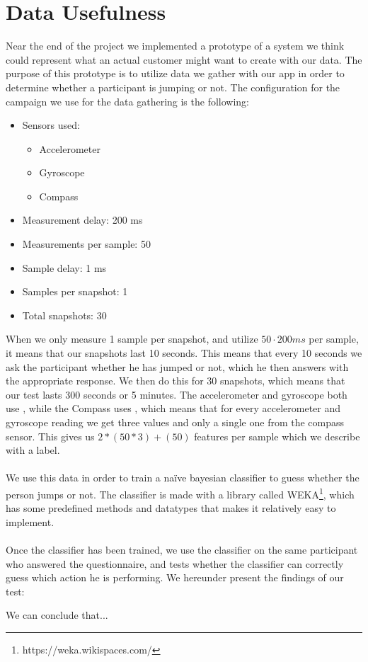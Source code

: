 
\section{Data Usefulness}
\label{sec:data_usefulness}

Near the end of the project we implemented a prototype of a system we think could represent what an actual customer might want to create with our data. The purpose of this prototype is to utilize data we gather with our app in order to determine whether a participant is jumping or not. The configuration for the campaign we use for the data gathering is the following:

\begin{itemize}
    \item Sensors used: 
    \begin{itemize}
        \item Accelerometer
        \item Gyroscope
        \item Compass
    \end{itemize}
    \item Measurement delay: 200 ms
    \item Measurements per sample: 50
    \item Sample delay: 1 ms
    \item Samples per snapshot: 1
    \item Total snapshots: 30
\end{itemize}

When we only measure 1 sample per snapshot, and utilize $50 \cdot 200ms$ per sample, it means that our snapshots last 10 seconds. This means that every 10 seconds we ask the participant whether he has jumped or not, which he then answers with the appropriate response. We then do this for 30 snapshots, which means that our test lasts 300 seconds or 5 minutes. The accelerometer and gyroscope both use , while the Compass uses , which means that for every accelerometer and gyroscope reading we get three values and only a single one from the compass sensor. This gives us $2*(50 * 3) + (50)$ features per sample which we describe with a label. 
\\\\
We use this data in order to train a naïve bayesian classifier to guess whether the person jumps or not. The classifier is made with a library called WEKA\footnote{https://weka.wikispaces.com/}, which has some predefined methods and datatypes that makes it relatively easy to implement. 
\\\\
Once the classifier has been trained, we use the classifier on the same participant who answered the questionnaire, and tests whether the classifier can correctly guess which action he is performing. We hereunder present the findings of our test: 


We can conclude that...

